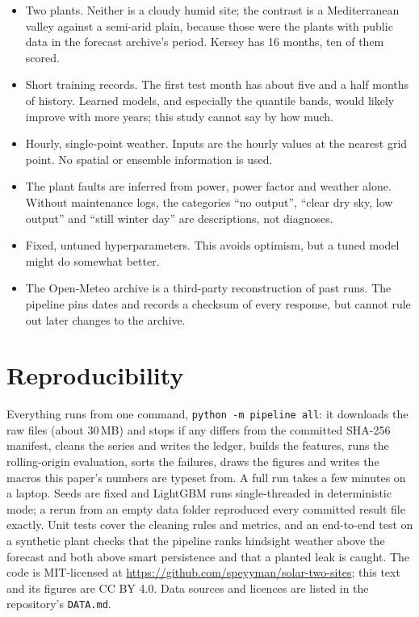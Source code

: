 \documentclass[11pt]{article}
\begin{document}
\begin{itemize}
\item Two plants. Neither is a cloudy humid site; the contrast is a Mediterranean valley against a semi-arid plain, because those were the plants with public data in the forecast archive's period. Kersey has 16 months, ten of them scored.
\item Short training records. The first test month has about five and a half months of history. Learned models, and especially the quantile bands, would likely improve with more years; this study cannot say by how much.
\item Hourly, single-point weather. Inputs are the hourly values at the nearest grid point. No spatial or ensemble information is used.
\item The plant faults are inferred from power, power factor and weather alone. Without maintenance logs, the categories ``no output'', ``clear dry sky, low output'' and ``still winter day'' are descriptions, not diagnoses.
\item Fixed, untuned hyperparameters. This avoids optimism, but a tuned model might do somewhat better.
\item The Open-Meteo archive is a third-party reconstruction of past runs. The pipeline pins dates and records a checksum of every response, but cannot rule out later changes to the archive.
\end{itemize}

\section{Reproducibility}

Everything runs from one command, \texttt{python -m pipeline all}: it downloads the raw files (about 30\,MB) and stops if any differs from the committed SHA-256 manifest, cleans the series and writes the ledger, builds the features, runs the rolling-origin evaluation, sorts the failures, draws the figures and writes the macros this paper's numbers are typeset from. A full run takes a few minutes on a laptop. Seeds are fixed and LightGBM runs single-threaded in deterministic mode; a rerun from an empty data folder reproduced every committed result file exactly. Unit tests cover the cleaning rules and metrics, and an end-to-end test on a synthetic plant checks that the pipeline ranks hindsight weather above the forecast and both above smart persistence and that a planted leak is caught. The code is MIT-licensed at \url{https://github.com/speyyman/solar-two-sites}; this text and its figures are CC BY 4.0. Data sources and licences are listed in the repository's \texttt{DATA.md}.
\end{document}
